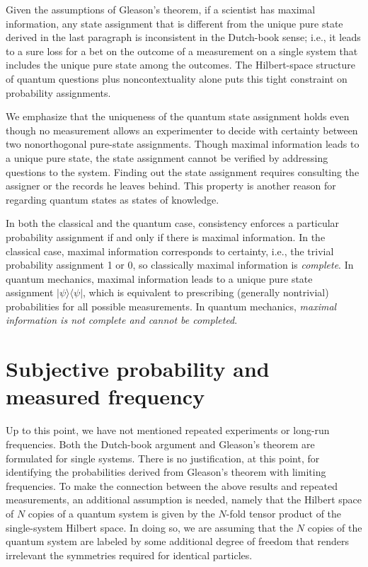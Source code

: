 \documentclass[aps,12pt]{revtex4}
\begin{document}
Given the assumptions of Gleason's theorem, if a scientist has
maximal information, any state assignment that is different from the
unique pure state derived in the last paragraph is inconsistent in
the Dutch-book sense; i.e., it leads to a sure loss for a bet on the
outcome of a measurement on a single system that includes the unique
pure state among the outcomes.  The Hilbert-space structure of
quantum questions plus noncontextuality alone puts this tight
constraint on probability assignments.

We emphasize that the uniqueness of the quantum state assignment
holds even though no measurement allows an experimenter to decide
with certainty between two nonorthogonal pure-state assignments.
Though maximal information leads to a unique pure state, the state
assignment cannot be verified by addressing questions to the system.
Finding out the state assignment requires consulting the assigner or
the records he leaves behind.  This property is another reason for
regarding quantum states as states of knowledge.

In both the classical and the quantum case, consistency enforces a
particular probability assignment if and only if there is maximal
information.  In the classical case, maximal information corresponds
to certainty, i.e., the trivial probability assignment 1 or 0, so
classically maximal information is {\it complete}.  In quantum
mechanics, maximal information leads to a unique pure state
assignment $|\psi\rangle\langle\psi|$, which is equivalent to
prescribing (generally nontrivial) probabilities for all possible
measurements. In quantum mechanics, {\it maximal information is not
complete and cannot be completed}.

\section{Subjective probability and measured frequency}

Up to this point, we have not mentioned repeated experiments or
long-run frequencies. Both the Dutch-book argument and Gleason's
theorem are formulated for single systems.  There is no
justification, at this point, for identifying the probabilities
derived from Gleason's theorem with limiting frequencies.  To make
the connection between the above results and repeated measurements,
an additional assumption is needed, namely that the Hilbert space of
$N$ copies of a quantum system is given by the $N$-fold tensor
product of the single-system Hilbert space.  In doing so, we are
assuming that the $N$ copies of the quantum system are labeled by
some additional degree of freedom that renders irrelevant the
symmetries required for identical particles.
\end{document}
